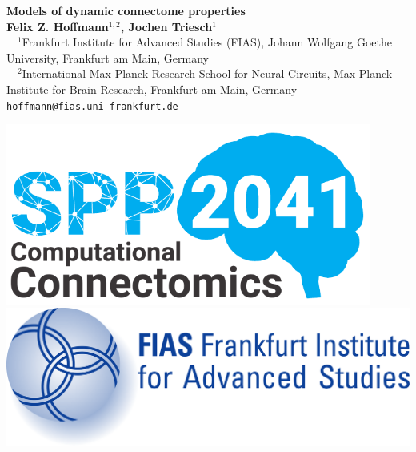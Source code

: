 \documentclass[a0,portrait]{a0poster}
\begin{document}

\vspace{-5cm}

\begin{minipage}[b]{0.75\linewidth}
  \veryHuge \textbf{Models of dynamic connectome properties} \color{Black}\\[1.5cm] 
  \huge \textbf{Felix Z. Hoffmann$^{1,2}$, Jochen Triesch$^1$}\\[0.5cm] %
\large $\quad ^1$Frankfurt Institute for Advanced Studies (FIAS), Johann Wolfgang Goethe University, Frankfurt am Main, Germany\\[0.2cm] %
$\quad ^2$International Max Planck Research School for Neural Circuits, Max Planck Institute for Brain Research, Frankfurt am Main, Germany\\[0.4cm]
\Large \texttt{hoffmann@fias.uni-frankfurt.de}\\
\end{minipage}
%
\begin{minipage}[b]{0.25\linewidth}
  \centering
  
  \vspace{-3cm}
  \includegraphics[width=12cm]{spp2041_logo.pdf}\\
  \vspace{2.2cm}
  \includegraphics[width=13.5cm]{FIAS-logo.pdf}\\
  \vspace{2cm}
  
\end{minipage}
\end{document}
